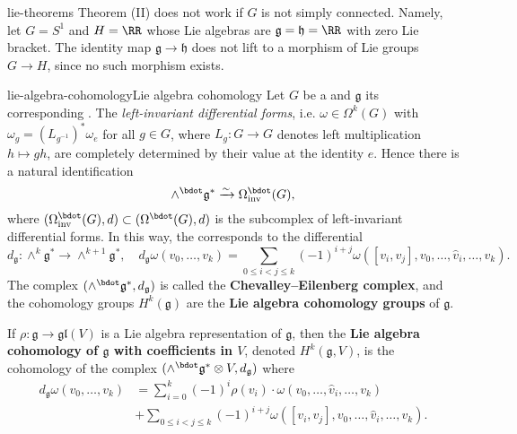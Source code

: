 \begin{example}{lie-theorems}
    Theorem (II) does not work if $G$ is not simply connected. Namely, let $G = S^1$ and $H = \RR$ whose Lie algebras are $\mathfrak{g} = \mathfrak{h} = \RR$ with zero Lie bracket. The identity map $\mathfrak{g} \to \mathfrak{h}$ does not lift to a morphism of Lie groups $G \to H$, since no such morphism exists.
\end{example}

\begin{topic}{lie-algebra-cohomology}{Lie algebra cohomology}
    Let $G$ be a  and $\mathfrak{g}$ its corresponding . The \textit{left-invariant differential forms}, i.e.  $\omega \in \Omega^k(G)$ with $\omega_g = (L_{g^{-1}})^* \omega_e$ for all $g \in G$, where $L_g : G \to G$ denotes left multiplication $h \mapsto gh$, are completely determined by their value at the identity $e$. Hence there is a natural identification
    \[ \wedge^\bdot \mathfrak{g}^* \xrightarrow{\sim} \Omega^\bdot_\textup{inv}(G), \]
    where $(\Omega^\bdot_\textup{inv}(G), d) \subset (\Omega^\bdot(G), d)$ is the subcomplex of left-invariant differential forms. In this way, the  corresponds to the differential
    \[ d_\mathfrak{g} : \wedge^k \mathfrak{g}^* \to \wedge^{k + 1} \mathfrak{g}^*, \quad d_\mathfrak{g} \omega(v_0, \ldots, v_k) = \sum_{0 \le i < j \le k} (-1)^{i + j} \omega([v_i, v_j], v_0, \ldots, \hat{v}_i, \ldots, v_k) . \]
    The complex $(\wedge^\bdot \mathfrak{g}^*, d_\mathfrak{g})$ is called the \textbf{Chevalley--Eilenberg complex}, and the cohomology groups $H^k(\mathfrak{g})$ are the \textbf{Lie algebra cohomology groups} of $\mathfrak{g}$.
    
    If $\rho : \mathfrak{g} \to \mathfrak{gl}(V)$ is a Lie algebra representation of $\mathfrak{g}$, then the \textbf{Lie algebra cohomology of $\mathfrak{g}$ with coefficients in $V$}, denoted $H^k(\mathfrak{g}, V)$, is the cohomology of the complex $(\wedge^\bdot \mathfrak{g}^* \otimes V, d_\mathfrak{g})$ where
    \[ \begin{aligned}
        d_\mathfrak{g} \omega(v_0, \ldots, v_k) &= \sum_{i = 0}^{k} (-1)^i \rho(v_i) \cdot \omega(v_0, \ldots, \hat{v}_i, \ldots, v_k) \\ &+ \sum_{0 \le i < j \le k} (-1)^{i + j} \omega([v_i, v_j], v_0, \ldots, \hat{v}_i, \ldots, v_k) .
    \end{aligned} \]
\end{topic}

